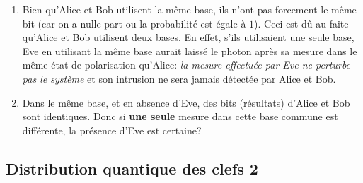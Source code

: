 \begin{enumerate}
{{
} }

\item Bien qu'Alice et Bob utilisent la même base, ils n'ont pas forcement le
même bit (car on a nulle part ou la probabilité est égale à $1$). Ceci est dû
au faite qu'Alice et Bob utilisent deux bases. En effet, s'ils utilisaient une
seule base, Eve en utilisant la même base aurait laissé le photon après sa
mesure dans le même état de polarisation qu'Alice: \emph{la mesure effectuée
par Eve ne perturbe pas le système} et son intrusion ne sera jamais détectée
par Alice et Bob.

\item Dans le même base, et en absence d'Eve, des bits (résultats) d'Alice et
Bob sont identiques. Donc si \textbf{une seule} mesure dans cette base commune
est différente, la présence d'Eve est certaine?
\end{enumerate}

\subsection{Distribution quantique des clefs 2}

